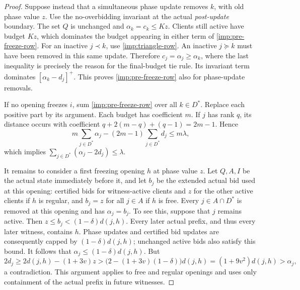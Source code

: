 \begin{proof}
Suppose instead that a simultaneous phase update removes $k$, with old
phase value $z$.  Use the no-overbidding invariant at the actual
\emph{post-update} boundary.  The set $Q$ is unchanged and
$\alpha_k=c_k\le Kz$.  Clients still active have budget $Kz$, which
dominates the budget appearing in either term of
\eqref{imp:pre-freeze-row}.  For an inactive $j\prec k$, use
\eqref{imp:triangle-row}.  An inactive $j\succeq k$ must have been
removed in this same update.  Therefore $c_j=\alpha_j\ge\alpha_k$,
where the last inequality is precisely the reason for the
final-budget tie rule.  Its invariant term dominates
$[\alpha_k-d_j]^+$.  This proves \eqref{imp:pre-freeze-row} also for
phase-update removals.

If no opening freezes $i$, sum \eqref{imp:pre-freeze-row} over all
$k\in D^*$.  Replace each positive part by its argument.  Each budget
has coefficient $m$.  If $j$ has rank $q$, its distance occurs with
coefficient $q+2(m-q)+(q-1)=2m-1$.  Hence
\[
 m\sum_{j\in D^*}\alpha_j-(2m-1)\sum_{j\in D^*}d_j
       \le m\lambda,
\]
which implies $\sum_{j\in D^*}(\alpha_j-2d_j)\le\lambda$.

It remains to consider a first freezing opening $h$ at phase value
$z$.  Let $Q,A,I$ be the actual state immediately before it, and let
$b_j$ be the extended actual bid used at this opening: certified bids
for witness-active clients and $z$ for the other active clients if
$h$ is regular, and $b_j=z$ for all $j\in A$ if $h$ is free.
Every $j\in A\cap D^*$ is removed at this opening and has
$\alpha_j=b_j$.  To see this, suppose that $j$ remains active.
Then $z\le b_j<(1-\delta)d(j,h)$.  Every later actual prefix, and
thus every later witness, contains $h$.  Phase updates and certified
bid updates are consequently capped by $(1-\delta)d(j,h)$; unchanged
active bids also satisfy this bound.  It follows that
$\alpha_j\le(1-\delta)d(j,h)$.  But
\[
 2d_j\ge2d(j,h)-(1+3v)z
    >\bigl(2-(1+3v)(1-\delta)\bigr)d(j,h)
     =(1+9v^2)d(j,h)>\alpha_j,
\]
a contradiction.  This argument applies to free and regular openings
and uses only containment of the actual prefix in future witnesses.


\end{proof}
